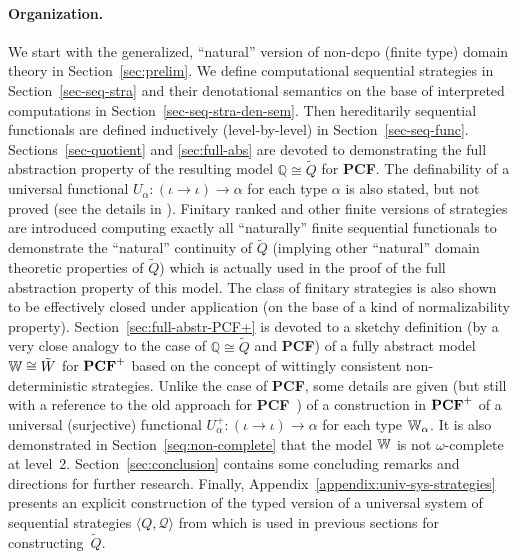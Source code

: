 \documentclass[fleqn]{LMCS}
\theoremstyle{plain}\newtheorem{satz}[thm]{Satz}
\theoremstyle{plain}\newtheorem{hyp}[thm]{Hypothesis}
\theoremstyle{plain}\newtheorem{hyps}[thm]{Hypotheses}
\theoremstyle{definition}\newtheorem{note}[thm]{Note}
\newcommand{\arr}{\rightarrow}
\newcommand{\la}{\langle}
\newcommand{\ra}{\rangle}
\newcommand{\tuple}[1]{\la #1 \ra}
\newcommand{\bbQ}{\mathbb{Q}}
\newcommand{\PCF}{\mbox{\bf PCF}}
\newcommand{\QQ}{{\mathcal Q}}
\newcommand{\tQ}{\tilde{Q}}
\newcommand{\tW}{\tilde{W}}
\newcommand{\?}{\mbox{?}}
\begin{document}
\paragraph*{\bf Organization.} 
We start with the generalized, ``natural'' version of non-dcpo 
(finite type) domain theory 
in Section~\ref{sec:prelim}. 
We define computational sequential strategies 
in Section~\ref{sec-seq-stra} and their denotational semantics 
on the base of interpreted computations in Section~\ref{sec-seq-stra-den-sem}. 
Then hereditarily 
sequential functionals are defined inductively (level-by-level) 
in Section~\ref{sec-seq-func}.  
Sections~\ref{sec-quotient} and \ref{sec:full-abs} are devoted to 
demonstrating 
the full abstraction property of the resulting model $\bbQ\cong\tQ$ for \PCF. 
The definability of a universal functional 
$U_{\alpha}:(\iota\arr\iota)\arr\alpha$
for each type $\alpha$ is also stated, but not proved (see the details in \cite{Saz76AL}).
Finitary ranked and other finite versions of 
strategies are introduced computing exactly all 
``naturally'' finite sequential functionals to demonstrate the ``natural'' continuity 
of $\tQ$ (implying other ``natural'' domain theoretic 
properties of $\tQ$) 
which is actually used in the proof of the full abstraction property of this model. 
The class of finitary strategies is also shown to be effectively closed under 
application (on the base of a kind of normalizability property).
Section~\ref{sec:full-abstr-PCF+} is devoted 
to a sketchy definition (by a very close analogy to the case of $\bbQ\cong\tQ$ and \PCF) 
of a fully abstract model $\bbW\cong\tW$ for $\PCF^+$ based on the concept of 
wittingly consistent non-deterministic strategies. 
Unlike the case of \PCF, some details are given 
(but still with a reference to the old approach for \PCF\ \cite{Saz76AL}) 
of a construction in $\PCF^+$ of a universal (surjective) 
functional $U_{\alpha}^{+}:(\iota\arr\iota)\arr\alpha$ 
for each type $\mathbb{W}_\alpha$. 
It is also demonstrated in 
Section~\ref{seq:non-complete} 
that the model $\mathbb{W}$ is not $\omega$-complete at level~2. 
Section~\ref{sec:conclusion} contains some concluding remarks 
and directions for further research. 
Finally, Appendix~\ref{appendix:univ-sys-strategies} 
presents an explicit construction of the typed version of a universal system 
of sequential strategies $\tuple{Q,\QQ}$ from \cite{Saz76t} which is used 
in previous sections for constructing~$\tQ$. 
\end{document}
